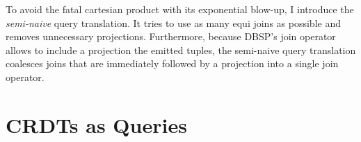 To avoid the fatal cartesian product with its exponential blow-up,
I introduce the \emph{semi-naive} query translation.
It tries to use as many equi joins as possible and removes unnecessary projections.
Furthermore, because DBSP's join operator allows to include a projection the
emitted tuples,
the semi-naive query translation coalesces joins that are immediately followed
by a projection into a single join operator.






\section{\acp{CRDT} as Queries}\label{sec:crdts-as-queries}
